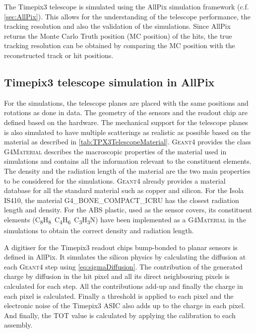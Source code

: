 The Timepix3 telescope is simulated using the AllPix simulation
framework (c.f. \cref{sec:AllPix}). This allows for the understanding
of the telescope performance, the tracking resolution and also the
validation of the simulations. Since AllPix returns the Monte Carlo
Truth position (MC position) of the hits, the true tracking resolution
can be obtained by comparing the MC position with the reconstructed
track or hit positions.  

\subsection{Timepix3 telescope simulation in AllPix}
For the simulations, the telescope planes are placed with the same
positions and rotations as done in data. The geometry of the sensors
and the readout chip are defined based on the hardware. The mechanical
support for the telescope planes is also simulated to have multiple
scatterings as realistic as possible based on the material as
described in \cref{tab:TPX3TelescopeMaterial}. \textsc{Geant4}
provides the class \textsc{G4Material} describes the macroscopic
properties of the material used in simulations and contains all the
information relevant to the constituent elements. The density and the
radiation length of the material are the two main properties to be
considered for the simulations. \textsc{Geant4} already provides a
material database for all the standard material such as copper and
silicon. For the Isola IS410, the material G4\_BONE\_COMPACT\_ICRU has
the closest radiation length and density. For the ABS plastic, used as
the sensor covers, its constituent elements
(C\textsubscript{8}H\textsubscript{8}~C\textsubscript{4}H\textsubscript{6}~C\textsubscript{3}H\textsubscript{3}N)
have been implemented as a \textsc{G4Material} in the simulations to
obtain the correct density and radiation length.


A digitiser for the Timepix3 readout chips bump-bonded to planar
sensors is defined in AllPix. It simulates the silicon physics by
calculating the diffusion at each \textsc{Geant4} step using
\cref{eq:sigmaDiffusion}. The contribution of the generated charge by
diffusion in the hit pixel and all its direct neighbouring pixels is
calculated for each step. All the contributions add-up and finally the
charge in each pixel is calculated. Finally a threshold is applied to
each pixel and the electronic noise of the Timepix3 ASIC also adds up
to the charge in each pixel. And finally, the TOT value is calculated
by applying the calibration to each assembly.


